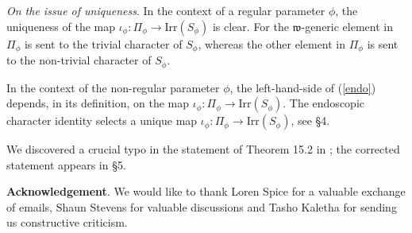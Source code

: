 \documentclass[11pt]{amsart}
\numberwithin{equation}{section}
\def\Irr{\mathrm{Irr}}
\def\fw{\mathfrak{w}}
\def\Gal{\mathrm{Gal}}
\def\C{\mathbb{C}}
\newcommand{\<}{\left\langle}
\renewcommand{\>}{\right\rangle}
\begin{document}
\emph{On the issue of uniqueness}.   In the context of a regular parameter $\phi$, 
the uniqueness of the map $\iota_\phi \colon \Pi_\phi \to \Irr(S_\phi)$ is clear. For the $\fw$-generic element in $\Pi_\phi$ is sent to the trivial character of $S_\phi$, whereas the other element in $\Pi_\phi$ is sent to the non-trivial character of $S_\phi$.  

In the context of the non-regular parameter $\phi$,  the left-hand-side of (\ref{endo}) depends, in its definition, on the map $\iota_\phi\colon \Pi_\phi \to \Irr(S_\phi)$.  The  endoscopic character identity selects a unique map
 $\iota_\phi : \Pi_\phi \to \Irr(S_\phi)$, see \S4.   

  
We discovered a crucial typo in the statement of Theorem 15.2 in \cite{ADSS}; the corrected statement appears in \S5.  

  \textbf{Acknowledgement}. We would like to thank Loren Spice for a valuable exchange of emails, Shaun Stevens for valuable discussions  and Tasho Kaletha for 
 sending us constructive criticism. 
 
\end{document}
